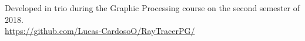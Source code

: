 \documentclass[]{deedy-resume-openfont}
\begin{document}
\begin{minipage}[t]{0.64\textwidth}
\begin{tightemize}
\item Developed in trio during the Graphic Processing course on the second semester of 2018. \\ \href{https://github.com/Lucas-CardosoO/RayTracerPG/}{https://github.com/Lucas-CardosoO/RayTracerPG/}
\end{tightemize}
\sectionsep

%
%

\end{minipage} 
\hfill
\end{document}
